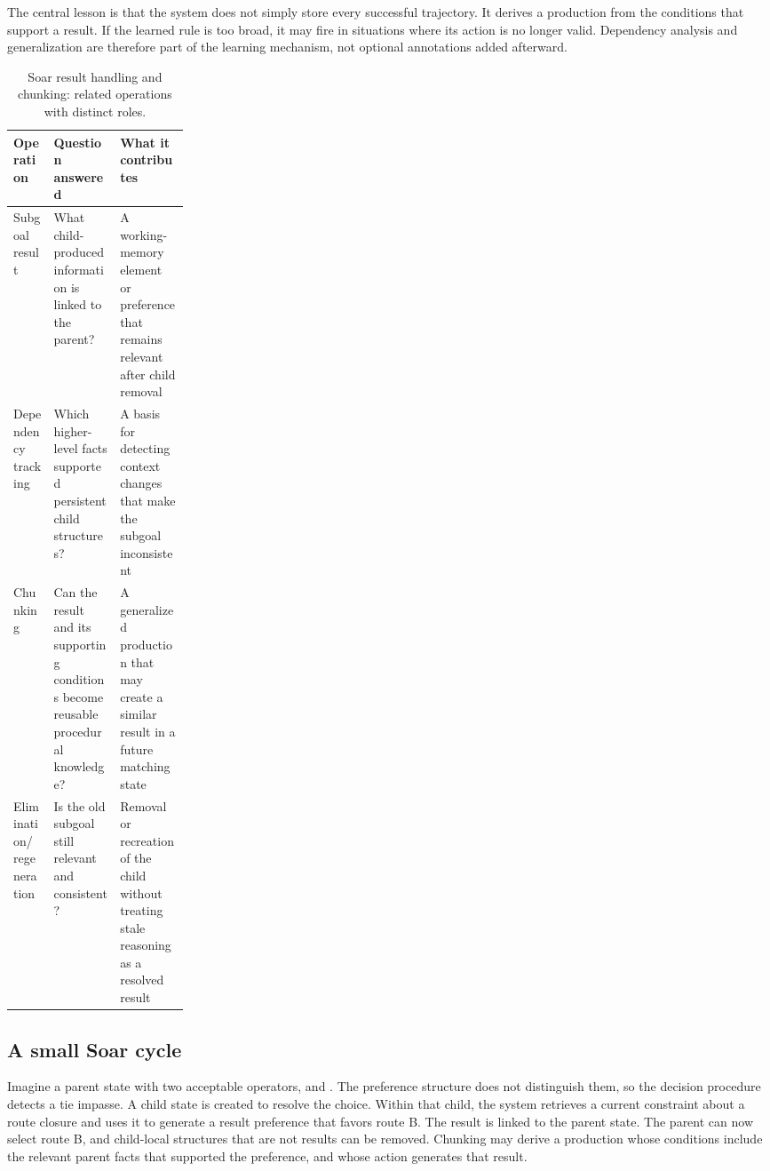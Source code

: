 The central lesson is that the system does not simply store every successful trajectory. It derives a production from the conditions that support a result. If the learned rule is too broad, it may fire in situations where its action is no longer valid. Dependency analysis and generalization are therefore part of the learning mechanism, not optional annotations added afterward.

\begin{table}[tbp]
\centering
\small
\caption{Soar result handling and chunking: related operations with distinct roles.}
\label{tab:ch13-result-chunking}
\begin{tabularx}{\linewidth}{@{}p{0.23\linewidth}XX@{}}
\toprule
\textbf{Operation} & \textbf{Question answered} & \textbf{What it contributes} \\
\midrule
Subgoal result & What child-produced information is linked to the parent? & A working-memory element or preference that remains relevant after child removal \\
Dependency tracking & Which higher-level facts supported persistent child structures? & A basis for detecting context changes that make the subgoal inconsistent \\
Chunking & Can the result and its supporting conditions become reusable procedural knowledge? & A generalized production that may create a similar result in a future matching state \\
\shortstack[l]{Elimination/\\regeneration} & Is the old subgoal still relevant and consistent? & Removal or recreation of the child without treating stale reasoning as a resolved result \\
\bottomrule
\end{tabularx}
\end{table}

\subsection{A small Soar cycle}

\BookExampleLabel{} Imagine a parent state with two acceptable operators,  and . The preference structure does not distinguish them, so the decision procedure detects a tie impasse. A child state is created to resolve the choice. Within that child, the system retrieves a current constraint about a route closure and uses it to generate a result preference that favors route B. The result is linked to the parent state. The parent can now select route B, and child-local structures that are not results can be removed. Chunking may derive a production whose conditions include the relevant parent facts that supported the preference, and whose action generates that result.

